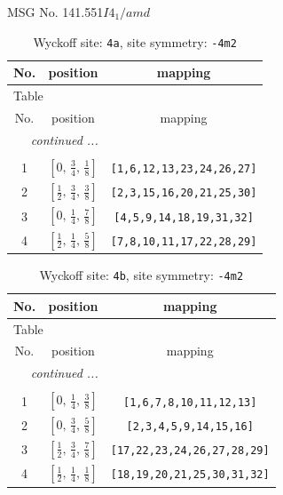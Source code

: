 \documentclass[fleqn,8pt]{jsarticle}
\begin{document}
\setcounter{MaxMatrixCols}{32}

\renewcommand{\tablename}{Table~}
\renewcommand{\figurename}{Figure~}
\begin{center}
\LARGE
MSG No. 141.551\quad$I4_{1}/amd$
\end{center}
\renewcommand{\arraystretch}{1.2}
\begin{longtable}{ccc}
\caption{Wyckoff site: {\tt 4a}, site symmetry: {\tt -4m2}}
 \\
 \hline \hline
No. & position & mapping \\ \hline \endfirsthead

\multicolumn{2}{l}{\tablename\ \thetable{}} \\
 \hline \hline
No. & position & mapping \\ \hline \endhead

 \hline \hline
\multicolumn{2}{r}{\footnotesize\it continued ...} \\ \endfoot

 \hline \hline
\multicolumn{2}{r}{} \\ \endlastfoot

1 & $\left[ 0,\, \frac{3}{4},\, \frac{1}{8} \right]$ & {\tt [1,6,12,13,23,24,26,27]} \\ \hline
2 & $\left[ \frac{1}{2},\, \frac{3}{4},\, \frac{3}{8} \right]$ & {\tt [2,3,15,16,20,21,25,30]} \\ \hline
3 & $\left[ 0,\, \frac{1}{4},\, \frac{7}{8} \right]$ & {\tt [4,5,9,14,18,19,31,32]} \\ \hline
4 & $\left[ \frac{1}{2},\, \frac{1}{4},\, \frac{5}{8} \right]$ & {\tt [7,8,10,11,17,22,28,29]} \\
\end{longtable}
\renewcommand{\arraystretch}{1.2}
\begin{longtable}{ccc}
\caption{Wyckoff site: {\tt 4b}, site symmetry: {\tt -4m2}}
 \\
 \hline \hline
No. & position & mapping \\ \hline \endfirsthead

\multicolumn{2}{l}{\tablename\ \thetable{}} \\
 \hline \hline
No. & position & mapping \\ \hline \endhead

 \hline \hline
\multicolumn{2}{r}{\footnotesize\it continued ...} \\ \endfoot

 \hline \hline
\multicolumn{2}{r}{} \\ \endlastfoot

1 & $\left[ 0,\, \frac{1}{4},\, \frac{3}{8} \right]$ & {\tt [1,6,7,8,10,11,12,13]} \\ \hline
2 & $\left[ 0,\, \frac{3}{4},\, \frac{5}{8} \right]$ & {\tt [2,3,4,5,9,14,15,16]} \\ \hline
3 & $\left[ \frac{1}{2},\, \frac{3}{4},\, \frac{7}{8} \right]$ & {\tt [17,22,23,24,26,27,28,29]} \\ \hline
4 & $\left[ \frac{1}{2},\, \frac{1}{4},\, \frac{1}{8} \right]$ & {\tt [18,19,20,21,25,30,31,32]} \\
\end{longtable}
\end{document}
